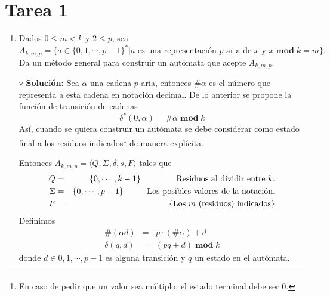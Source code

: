 \documentclass{article}
\begin{document}
\section*{\LARGE{Tarea 1}}
\begin{enumerate}
\item Dados $0 \leq m < k$ y $2 \leq p$, sea
  \[
  A_{k, m, p} = \{a \in \{0, 1, \dotsm, p-1\}^{*} | a
  \text{ es una representación $p$-aria de $x$ y $x\; \mathbf{mod}\; k = m$}\}.
  \]
  Da un método general para construir un autómata que acepte $A_{k, m, p}$.
  
  $\triangledown$ \textbf{Solución:}
  Sea $\alpha$ una cadena $p$-aria, entonces $\#\alpha$ es el
  número que representa a esta cadena en notación decimal. De
  lo anterior se propone la función de transición de cadenas
  \[
  \delta^{*}(0, \alpha) = \#\alpha\; \mathbf{mod}\; k
  \]
  Así, cuando se quiera construir un aut\'omata se debe considerar
  como estado final a los residuos indicados\footnote{En caso de
  pedir que un valor sea m\'ultiplo, el estado terminal debe ser $0$.}
  de manera explícita.
  
  Entonces $A_{k, m, p} = \langle Q, \Sigma, \delta, s, F \rangle$ tales que
  \begin{eqnarray*}
    Q &=& \{0, \dotsm, k - 1\} \hspace*{1.5cm} \text{Residuos al dividir entre }k.\\
    \Sigma &=& \{0, \dotsm, p - 1\} \hspace*{1cm} \text{Los posibles valores de la notación.}\\
    F &=& \{\text{Los $m$ (residuos) indicados}\}
  \end{eqnarray*}
  Definimos
  \begin{eqnarray*}
    \#(\alpha d) &=& p \cdot (\#\alpha) + d\\
    \delta(q, d) &=& (pq + d)\; \mathbf{mod}\; k
  \end{eqnarray*}
  donde $d\in{0,1, \dotsm, p - 1}$ es alguna transición y $q$ un estado
  en el autómata.
  

\end{enumerate}
\end{document}
